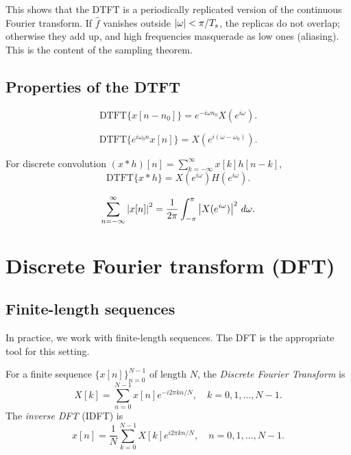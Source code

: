 \begin{notechapter}
This shows that the DTFT is a periodically replicated version of the continuous Fourier transform. If $\hat f$ vanishes outside $\left|\omega\right| < \pi/T_s$, the replicas do not overlap; otherwise they add up, and high frequencies masquerade as low ones (aliasing). This is the content of the sampling theorem.

\subsection{Properties of the DTFT}

\begin{proposition}
\[
\text{DTFT}\{x[n - n_0]\} = e^{-i\omega n_0} X(e^{i\omega}).
\]
\end{proposition}

\begin{proposition}
\[
\text{DTFT}\{e^{i\omega_0 n} x[n]\} = X(e^{i(\omega - \omega_0)}).
\]
\end{proposition}

\begin{proposition}[Convolution]
For discrete convolution $(x * h)[n] = \sum_{k=-\infty}^{\infty} x[k] h[n-k]$,
\[
\text{DTFT}\{x * h\} = X(e^{i\omega}) H(e^{i\omega}).
\]
\end{proposition}

\begin{proposition}
\[
\sum_{n=-\infty}^{\infty} \left|x[n]\right|^2 = \frac{1}{2\pi} \int_{-\pi}^{\pi} \left|X(e^{i\omega})\right|^2 \, d\omega.
\]
\end{proposition}

\section{Discrete Fourier transform (DFT)}

\subsection{Finite-length sequences}

In practice, we work with finite-length sequences. The DFT is the appropriate tool for this setting.

\begin{definition}[DFT]\label{fourier-analysis:def:dft}
For a finite sequence $\{x[n]\}_{n=0}^{N-1}$ of length $N$, the \emph{Discrete Fourier Transform} is
\[
X[k] = \sum_{n=0}^{N-1} x[n] e^{-i 2\pi kn/N}, \quad k = 0, 1, \ldots, N-1.
\]
The \emph{inverse DFT} (IDFT) is
\[
x[n] = \frac{1}{N} \sum_{k=0}^{N-1} X[k] e^{i 2\pi kn/N}, \quad n = 0, 1, \ldots, N-1.
\]
\end{definition}


\end{notechapter}
